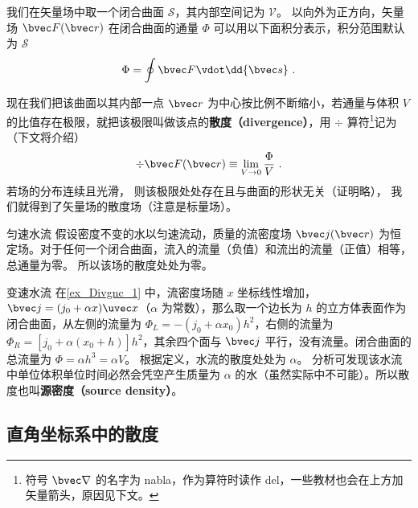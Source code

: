 

我们在矢量场中取一个闭合曲面 $\mathcal{S}$，其内部空间记为 $\mathcal{V}$。 以向外为正方向，矢量场 $\bvec F(\bvec r)$ 在闭合曲面的通量 $\Phi$ 可以用以下面积分表示，积分范围默认为 $\mathcal{S}$
\begin{equation}\label{eq_Divgnc_1}
\Phi  = \oint \bvec F \vdot \dd{\bvec s}~.
\end{equation}

现在我们把该曲面以其内部一点 $\bvec r$ 为中心按比例不断缩小，若通量与体积 $V$ 的比值存在极限，就把该极限叫做该点的\textbf{散度（divergence）}，用 $\div$ 算符\footnote{符号 $\bvec\nabla$ 的名字为 nabla，作为算符时读作 del，一些教材也会在上方加矢量箭头，原因见下文。}记为（下文将介绍）
\begin{equation}\label{eq_Divgnc_2}
\div \bvec F(\bvec r) \equiv \lim_{V \to 0} \frac{\Phi }{V}~.
\end{equation}
若场的分布连续且光滑， 则该极限处处存在且与曲面的形状无关（证明略）， 我们就得到了矢量场的散度场（注意是标量场）。

\begin{example}{匀速水流}\label{ex_Divgnc_1}
假设密度不变的水以匀速流动，质量的流密度场 $\bvec j(\bvec r)$ 为恒定场。对于任何一个闭合曲面，流入的流量（负值）和流出的流量（正值）相等，总通量为零。 所以该场的散度处处为零。
\end{example}

\begin{example}{变速水流}
在\autoref{ex_Divgnc_1} 中，流密度场随 $x$ 坐标线性增加， $\bvec j = (j_0 + \alpha x)\uvec x$（$\alpha$ 为常数），那么取一个边长为 $h$ 的立方体表面作为闭合曲面，从左侧的流量为 $\Phi_L =  - (j_0 + \alpha x_0) h^2$，右侧的流量为 $\Phi_R = [j_0 + \alpha (x_0 + h)] h^2$，其余四个面与 $\bvec j$ 平行，没有流量。闭合曲面的总流量为 $\Phi  = \alpha h^3 = \alpha V$。 根据定义，水流的散度处处为 $\alpha$。 分析可发现该水流中单位体积单位时间必然会凭空产生质量为 $\alpha$ 的水（虽然实际中不可能）。所以散度也叫\textbf{源密度（source density）}。
\end{example}

\subsection{直角坐标系中的散度}

